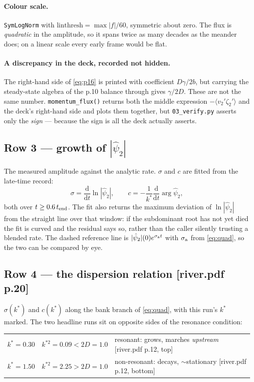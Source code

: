 \documentclass[11pt]{article}
\newcommand{\code}[1]{\texttt{\small #1}}
\newcommand{\deck}[1]{{\color{blue!45!black}\small[river.pdf p.#1]}}
\newcommand{\zt}{\zeta_2'}
\newcommand{\ks}{k^{*}}
\newcommand{\kss}{k^{*2}}   %
\begin{document}
\paragraph{Colour scale.} \code{SymLogNorm} with
$\text{linthresh}=\max|f|/60$, symmetric about zero. The flux is \emph{quadratic} in the
amplitude, so it spans twice as many decades as the meander does; on a linear scale every
early frame would be flat.

\paragraph{A discrepancy in the deck, recorded not hidden.} The right-hand side of
\eqref{eq:p16} is printed with coefficient $D\gamma/2b$, but carrying the steady-state
algebra of the p.10 balance through gives $\gamma/2D$. These are not the same number.
\code{momentum\_flux()} returns both the middle expression $-\langle v_2'\zt\rangle$ and
the deck's right-hand side and plots them together, but \code{03\_verify.py} asserts only
the \emph{sign} --- because the sign is all the deck actually asserts.

\subsection{Row 3 --- growth of $|\hat\psi_2|$}
The measured amplitude against the analytic rate. $\sigma$ and $c$ are fitted from the
late-time record:
\begin{equation}
  \sigma=\frac{\mathrm d}{\mathrm dt}\ln|\hat\psi_2|,\qquad
  c=-\frac{1}{\ks}\frac{\mathrm d}{\mathrm dt}\arg\hat\psi_2,
\end{equation}
both over $t\ge0.6\,t_{\rm end}$. The fit also returns the maximum deviation of
$\ln|\hat\psi_2|$ from the straight line over that window: if the subdominant root has not
yet died the fit is curved and the residual says so, rather than the caller silently
trusting a blended rate. The dashed reference line is $|\hat\psi_2|(0)e^{\sigma_{\rm a}t}$
with $\sigma_{\rm a}$ from \eqref{eq:quad}, so the two can be compared by eye.

\subsection{Row 4 --- the dispersion relation \deck{20}}
$\sigma(\ks)$ and $c(\ks)$ along the bank branch of \eqref{eq:quad}, with this run's $\ks$
marked. The two headline runs sit on opposite sides of the resonance condition:
\begin{center}\small
\begin{tabular}{lll}
\toprule
$\ks=0.30$ & $\kss=0.09<2D=1.0$ & resonant: grows, marches \emph{upstream} \deck{12, top}\\
$\ks=1.50$ & $\kss=2.25>2D=1.0$ & non-resonant: decays, $\sim$stationary \deck{12, bottom}\\
\bottomrule
\end{tabular}
\end{center}
\end{document}
